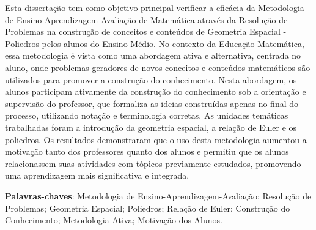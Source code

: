
\setlength{\absparsep}{18pt} %
\begin{resumo}
    Esta dissertação tem como objetivo principal verificar a eficácia da Metodologia de Ensino-Aprendizagem-Avaliação de Matemática através da Resolução de Problemas na construção de conceitos e conteúdos de Geometria Espacial - Poliedros pelos alunos do Ensino Médio. No contexto da Educação Matemática, essa metodologia é vista como uma abordagem ativa e alternativa, centrada no aluno, onde problemas geradores de novos conceitos e conteúdos matemáticos são utilizados para promover a construção do conhecimento. Nesta abordagem, os alunos participam ativamente da construção do conhecimento sob a orientação e supervisão do professor, que formaliza as ideias construídas apenas no final do processo, utilizando notação e terminologia corretas. As unidades temáticas trabalhadas foram a introdução da geometria espacial, a relação de Euler e os poliedros. Os resultados demonstraram que o uso desta metodologia aumentou a motivação tanto dos professores quanto dos alunos e permitiu que os alunos relacionassem suas atividades com tópicos previamente estudados, promovendo uma aprendizagem mais significativa e integrada.

    \textbf{Palavras-chaves}:  Metodologia de Ensino-Aprendizagem-Avaliação; Resolução de Problemas; Geometria Espacial; Poliedros; Relação de Euler; Construção do Conhecimento; Metodologia Ativa; Motivação dos Alunos.

\end{resumo}
